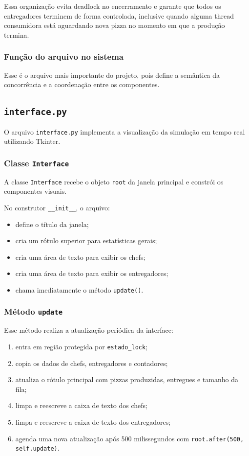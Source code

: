 \documentclass[12pt,a4paper]{article}
\begin{document}
Essa organiza\c{c}\~ao evita deadlock no encerramento e garante que todos os entregadores terminem de forma controlada, inclusive quando alguma thread consumidora est\'a aguardando nova pizza no momento em que a produ\c{c}\~ao termina.

\subsubsection{Fun\c{c}\~ao do arquivo no sistema}
Esse \'e o arquivo mais importante do projeto, pois define a sem\^antica da concorr\^encia e a coordena\c{c}\~ao entre os componentes.

\subsection{\texttt{interface.py}}
O arquivo \texttt{interface.py} implementa a visualiza\c{c}\~ao da simula\c{c}\~ao em tempo real utilizando Tkinter.

\subsubsection{Classe \texttt{Interface}}
A classe \texttt{Interface} recebe o objeto \texttt{root} da janela principal e constr\'oi os componentes visuais.

No construtor \texttt{\_\_init\_\_}, o arquivo:
\begin{itemize}
    \item define o t\'itulo da janela;
    \item cria um r\'otulo superior para estat\'isticas gerais;
    \item cria uma \'area de texto para exibir os chefs;
    \item cria uma \'area de texto para exibir os entregadores;
    \item chama imediatamente o m\'etodo \texttt{update()}.
\end{itemize}

\subsubsection{M\'etodo \texttt{update}}
Esse m\'etodo realiza a atualiza\c{c}\~ao peri\'odica da interface:
\begin{enumerate}
    \item entra em regi\~ao protegida por \texttt{estado\_lock};
    \item copia os dados de chefs, entregadores e contadores;
    \item atualiza o r\'otulo principal com pizzas produzidas, entregues e tamanho da fila;
    \item limpa e reescreve a caixa de texto dos chefs;
    \item limpa e reescreve a caixa de texto dos entregadores;
    \item agenda uma nova atualiza\c{c}\~ao ap\'os 500 milissegundos com \texttt{root.after(500, self.update)}.
\end{enumerate}
\end{document}
